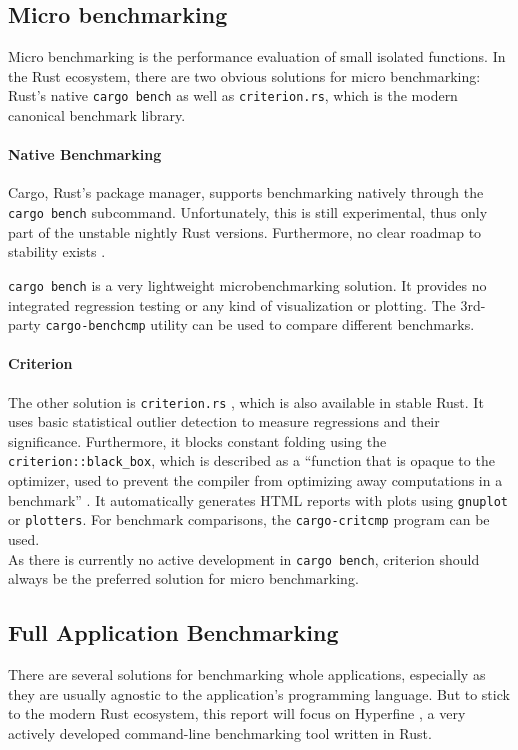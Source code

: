 \subsection{Micro benchmarking}
Micro benchmarking is the performance evaluation of small isolated functions. In the Rust ecosystem, there are two obvious solutions for micro benchmarking: Rust's native \texttt{cargo bench} as well as \texttt{criterion.rs}, which is the modern canonical benchmark library.

\paragraph{Native Benchmarking} Cargo, Rust's package manager, supports benchmarking natively through the \texttt{cargo bench} \cite{cargobench} subcommand. Unfortunately, this is still experimental, thus only part of the unstable nightly Rust versions. Furthermore, no clear roadmap to stability exists \cite{benchstable}.

\texttt{cargo bench} is a very lightweight microbenchmarking solution. It provides no integrated regression testing or any kind of visualization or plotting. The 3rd-party \texttt{cargo-benchcmp} \cite{benchcmp} utility can be used to compare different benchmarks.

\paragraph{Criterion} The other solution is \texttt{criterion.rs} \cite{criterion}, which is also available in stable Rust. It uses basic statistical outlier detection to measure regressions and their significance. Furthermore, it blocks constant folding using the \texttt{criterion::black\_box}, which is described as a ``function that is opaque to the optimizer, used to prevent the compiler from optimizing away computations in a benchmark'' \cite{blackbox}. It automatically generates HTML reports with plots using \texttt{gnuplot} or \texttt{plotters}. For benchmark comparisons, the \texttt{cargo-critcmp} \cite{critcmp} program can be used.\\

As there is currently no active development in \texttt{cargo bench}, criterion should always be the preferred solution for micro benchmarking.

\subsection{Full Application Benchmarking}
There are several solutions for benchmarking whole applications, especially as they are usually agnostic to the application's programming language. But to stick to the modern Rust ecosystem, this report will focus on Hyperfine \cite{hyperfine}, a very actively developed command-line benchmarking tool written in Rust.\\

